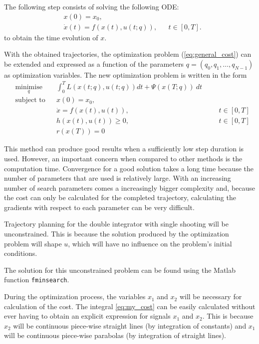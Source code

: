 \par The following step consists of solving the following \ac{ODE}:
\begin{equation}
    \label{eq:ode_zoh}
    \begin{aligned}
        & x(0) = x_0, \\
        & \dot{x}(t) = f(x(t),u(t;q)), && t\in[0,T].
    \end{aligned}
\end{equation}
to obtain the time evolution of $x$.

\par With the obtained trajectories, the optimization problem (\ref{eq:general_cost}) can be extended and expressed as a function of the parameters $q=(q_0,q_1,\dots,q_{N-1})$ as optimization variables. The new optimization problem is written in the form  
\begin{equation}
    \begin{aligned}
    & \underset{q}{\text{minimise}} && \int_0^T L(x(t;q),u(t;q))dt + \Psi (x(T;q)) \ dt \\
    & \text{subject to}  && x(0) = x_0, \\
        & && \dot{x} = f(x(t), u(t)), &&& t \in [0,T]  \\
        & && h(x(t),u(t)) \geq 0, &&&  t \in [0,T]  \\
        & && r(x(T)) = 0
    \end{aligned}
    \label{eq:cost_zoh}
\end{equation}

\par This method can produce good results when a sufficiently low step duration is used. However, an important concern when compared to other methods is the computation time. Convergence for a good solution takes a long time because the number of parameters that are used is relatively large. With an increasing number of search parameters comes a increasingly bigger complexity and, because the cost can only be calculated for the completed trajectory, calculating the gradients with respect to each parameter can be very difficult.

\par Trajectory planning for the double integrator with single shooting will be unconstrained. This is because the solution produced by the optimization problem will shape $u$, which will have no influence on the problem's initial conditions. 
\par The solution for this unconstrained problem can be found using the Matlab function \texttt{fminsearch}.
\par During the optimization process, the variables $x_1$ and $x_2$ will be necessary for calculation of the cost. The integral \ref{eq:my_cost} can be easily calculated without ever having to obtain an explicit expression for signals $x_1$ and $x_2$. This is because $x_2$ will be continuous piece-wise straight lines (by integration of constants) and $x_1$ will be continuous piece-wise parabolas (by integration of straight lines).

